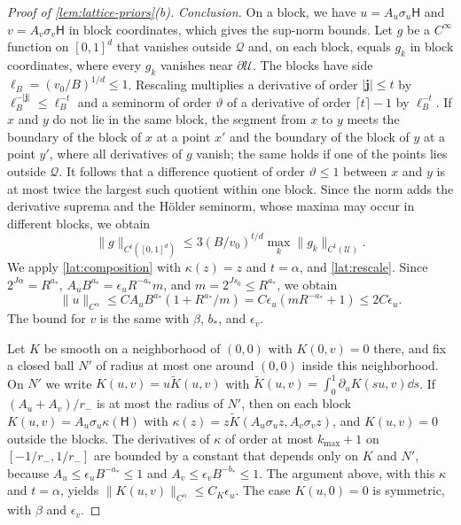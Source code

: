 \begin{proof}[Proof of \cref{lem:lattice-priors}(b)]
\emph{Conclusion.} On a block, we have $u=A_u\sigma_u\mathsf H$ and
$v=A_v\sigma_v\mathsf H$ in block coordinates, which gives the
sup-norm bounds. Let $g$ be a $C^\infty$ function on $[0,1]^d$ that
vanishes outside $\mathcal Q$ and, on each block, equals $g_k$ in block
coordinates, where every $g_k$ vanishes near $\partial\mathcal U$. The
blocks have side $\ell_B=(v_0/B)^{1/d}\le1$. Rescaling multiplies a
derivative of order $|\mathbf j|\le t$ by $\ell_B^{-|\mathbf j|}\le\ell_B^{-t}$
and a seminorm of order $\vartheta$ of a derivative of order
$\lceil t\rceil-1$ by $\ell_B^{-t}$. If $x$ and $y$ do not lie in the
same block, the segment from $x$ to $y$ meets the boundary of the block
of $x$ at a point $x'$ and the boundary of the block of $y$ at a point
$y'$, where all derivatives of $g$ vanish; the same holds if one of the
points lies outside $\mathcal Q$. It follows that a difference quotient
of order
$\vartheta\le1$ between $x$ and $y$ is at most twice the largest such
quotient within one block. Since the norm adds the derivative suprema
and the H\"older seminorm, whose maxima may occur in different blocks,
we obtain
\begin{equation}\label{lat:rescale}
 \|g\|_{C^t([0,1]^d)}\le3(B/v_0)^{t/d}\max_k\|g_k\|_{C^t(\mathcal U)}.
\end{equation}
We apply \eqref{lat:composition} with $\kappa(z)=z$ and $t=\alpha$, and
\eqref{lat:rescale}. Since $2^{J\alpha}=R^{a_*}$,
$A_uB^{a_*}=\epsilon_uR^{-a_*}m$, and $m=2^{Js_0}\le R^{a_*}$, we obtain
\[
 \|u\|_{C^\alpha}\le CA_uB^{a_*}(1+R^{a_*}/m)
 =C\epsilon_u(mR^{-a_*}+1)\le2C\epsilon_u .
\]
The bound for $v$ is the same with $\beta$, $b_*$, and $\epsilon_v$.

Let $K$ be smooth on a neighborhood of $(0,0)$ with $K(0,v)=0$ there,
and fix a closed ball $N'$ of radius at most one around $(0,0)$ inside
this neighborhood. On $N'$ we write $K(u,v)=u\widetilde K(u,v)$ with
$\widetilde K(u,v)=\int_0^1\partial_uK(su,v)\dd s$. If
$(A_u+A_v)/r_-$ is at most the radius of $N'$, then on each block
$K(u,v)=A_u\sigma_u\kappa(\mathsf H)$ with
$\kappa(z)=z\widetilde K(A_u\sigma_uz,A_v\sigma_vz)$, and $K(u,v)=0$
outside the blocks. The derivatives of $\kappa$ of order at most
$k_{\max}+1$ on $[-1/r_-,1/r_-]$ are bounded by a constant that depends
only on $K$ and $N'$, because $A_u\le\epsilon_uB^{-a_*}\le1$ and
$A_v\le\epsilon_vB^{-b_*}\le1$. The argument above, with this
$\kappa$ and $t=\alpha$, yields
$\|K(u,v)\|_{C^\alpha}\le C_K\epsilon_u$. The case $K(u,0)=0$ is
symmetric, with $\beta$ and $\epsilon_v$.
\end{proof}

